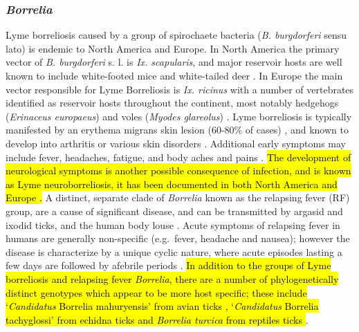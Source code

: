 \documentclass[a4paper, nobind]{templates/ociamthesis}
\begin{document}
\hypertarget{borrelia}{%
\subsubsection{\texorpdfstring{\emph{Borrelia}}{Borrelia}}\label{borrelia}}

Lyme borreliosis caused by a group of spirochaete bacteria (\emph{B. burgdorferi} sensu lato) is endemic to North America and Europe.
In North America the primary vector of \emph{B. burgdorferi} s. l. is \emph{Ix. scapularis}, and major reservoir hosts are well known to include white-footed mice and white-tailed deer \autocite{halseyRoleIxodesScapularis2018}.
In Europe the main vector responsible for Lyme Borreliosis is \emph{Ix. ricinus} \autocite{kirsteinLocalVariationsDistribution1997} with a number of vertebrates identified as reservoir hosts throughout the continent, most notably hedgehogs (\emph{Erinaceus europaeus}) and voles (\emph{Myodes glareolus}) \autocite{jahfariMeltingPotTickborne2017,coipanGeneticDiversityBorrelia2018,estrada-penaHighThroughputSequencing2018}.
Lyme borreliosis is typically manifested by an erythema migrans skin lesion (60-80\% of cases) \autocite{rizzoliLymeBorreliosisEurope2011}, and known to develop into arthritis or various skin disorders \autocite{stanekLymeBorreliosis2012}.
Additional early symptoms may include fever, headaches, fatigue, and body aches and pains \autocite{rizzoliLymeBorreliosisEurope2011,clarkLymeBorreliosisHuman2013}.
\hl{The development of neurological symptoms is another possible consequence of infection, and is known as Lyme neuroborreliosis, it has been documented in both North America and Europe \autocite{clarkLymeBorreliosisHuman2013,strleComparisonFindingsPatients2006}.}
A distinct, separate clade of \emph{Borrelia} known as the relapsing fever (RF) group, are a cause of significant disease, and can be transmitted by argasid and ixodid ticks, and the human body louse \autocite{lopezTickBorneRelapsingFever2016}.
Acute symptoms of relapsing fever in humans are generally non-specific (e.g.~fever, headache and nausea); however the disease is characterize by a unique cyclic nature, where acute episodes lasting a few days are followed by afebrile periods \autocite{dworkinTickborneRelapsingFever2008}.
\hl{In addition to the groups of Lyme borreliosis and relapsing fever \emph{Borrelia}, there are a number of phylogenetically distinct genotypes which appear to be more host specific; these include `\emph{Candidatus} Borrelia mahuryensis' from avian ticks \autocite{munoz-lealCandidatusBorreliaIbitipoquensis2020}, `\emph{Candidatus} Borrelia tachyglossi' from echidna ticks \autocite{lohMolecularCharacterizationCandidatus2017} and \emph{Borrelia turcica} from reptiles ticks \autocite{gunerBorreliaTurcicaSp2004}}.
\end{document}
